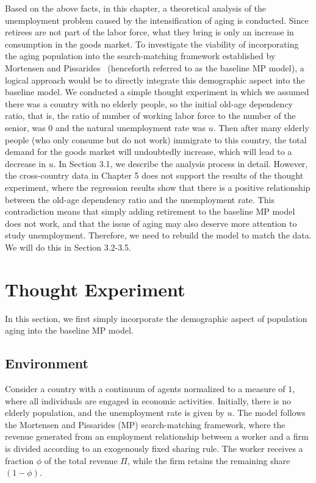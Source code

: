 \documentclass[ %
    final,
    scrbook,
    listoffigures,
    listoftables, 
    glossary]{cu-thesis}
\begin{document}
Based on the above facts, in this chapter, a theoretical analysis of the unemployment problem caused by the intensification of aging is conducted. Since retirees are not part of the labor force, what they bring is only an increase in consumption in the goods market. To investigate the viability of incorporating the aging population into the search-matching framework established by Mortensen and Pissarides~\cite{mortensen1994job} (henceforth referred to as the baseline MP model), a logical approach would be to directly integrate this demographic aspect into the baseline model. We conducted a simple thought experiment in which we assumed there was a country with no elderly people, so the initial old-age dependency ratio, that is, the ratio of number of working labor force to the number of the senior, was $0$ and the natural unemployment rate was $u$. Then after many elderly people (who only consume but do not work) immigrate to this country, the total demand for the goods market will undoubtedly increase, which will lead to a decrease in $u$. In Section 3.1, we describe the analysis process in detail. However, the cross-country data in Chapter 5 does not support the results of the thought experiment, where the regression results show that there is a positive relationship between the old-age dependency ratio and the unemployment rate. This contradiction means that simply adding retirement to the baseline MP model does not work, and that the issue of aging may also deserve more attention to study unemployment. Therefore, we need to rebuild the model to match the data. We will do this in Section 3.2-3.5.
\section{Thought Experiment}
In this section, we first simply incorporate the demographic aspect of population aging into the baseline MP model. 
\subsection{Environment}
Consider a country with a continuum of agents normalized to a measure of $1$, where all individuals are engaged in economic activities. Initially, there is no elderly population, and the unemployment rate is given by $u$. The model follows the Mortensen and Pissarides (MP) search-matching framework, where the revenue generated from an employment relationship between a worker and a firm is divided according to an exogenously fixed sharing rule. The worker receives a fraction $\phi$ of the total revenue $\Pi$, while the firm retains the remaining share $(1-\phi)$.
\end{document}
